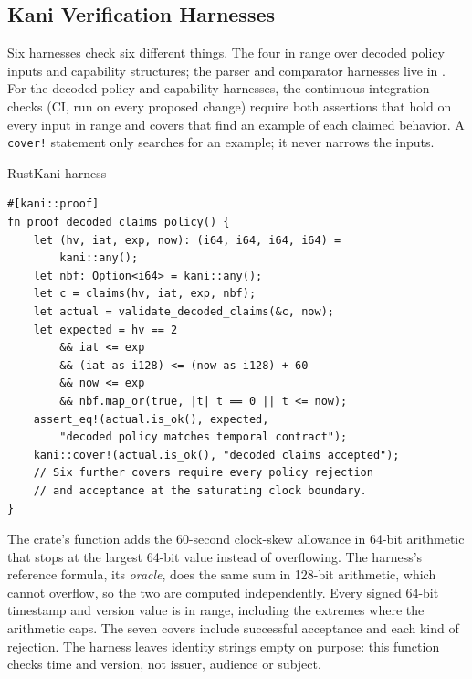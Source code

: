 \documentclass[11pt,a4paper]{article}
\theoremstyle{definition}
\begin{document}
\subsection{Kani Verification Harnesses}

Six harnesses check six different things. The four in
 range over decoded policy
inputs and capability structures; the parser and comparator harnesses live
in . For the decoded-policy and capability harnesses, the continuous-integration checks (CI, run on every proposed change) require both assertions
that hold on every input in range and covers that find an example of each
claimed behavior. A \texttt{cover!} statement only searches for an example;
it never narrows the inputs.

\begin{pdlisting}{Rust}{Kani harness}
\begin{lstlisting}[style=rust, caption={Decoded lifetime policy: an excerpt of the executable Kani harness. The helper constructs actual HarborCardClaims; the predicate is called by the signed-token verifier.}]
#[kani::proof]
fn proof_decoded_claims_policy() {
    let (hv, iat, exp, now): (i64, i64, i64, i64) =
        kani::any();
    let nbf: Option<i64> = kani::any();
    let c = claims(hv, iat, exp, nbf);
    let actual = validate_decoded_claims(&c, now);
    let expected = hv == 2
        && iat <= exp
        && (iat as i128) <= (now as i128) + 60
        && now <= exp
        && nbf.map_or(true, |t| t == 0 || t <= now);
    assert_eq!(actual.is_ok(), expected,
        "decoded policy matches temporal contract");
    kani::cover!(actual.is_ok(), "decoded claims accepted");
    // Six further covers require every policy rejection
    // and acceptance at the saturating clock boundary.
}
\end{lstlisting}
\end{pdlisting}

The crate's function adds the 60-second clock-skew allowance in 64-bit
arithmetic that stops at the largest 64-bit value instead of overflowing. The
harness's reference formula, its \emph{oracle}, does the same sum in 128-bit
arithmetic, which cannot overflow, so the two are computed independently. Every signed 64-bit timestamp
and version value is in range, including the extremes where the arithmetic
caps. The seven covers include successful acceptance and each kind of
rejection. The harness leaves identity strings empty on purpose: this
function checks time and version, not issuer, audience or subject.
\end{document}
